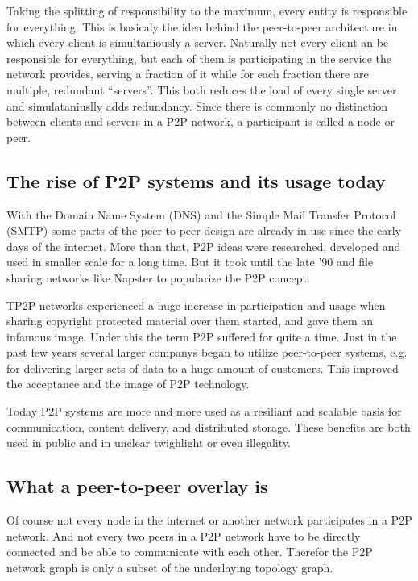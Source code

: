 Taking the splitting of responsibility to the maximum, every entity is responsible for everything. This is basicaly the idea behind the peer-to-peer architecture in which every client is simultaniously a server. Naturally not every client an be responsible for everything, but each of them is participating in the service the network provides, serving a fraction of it while for each fraction there are multiple, redundant ``servers''. This  both reduces the load of every single server and simulataniuslly adds redundancy. Since there is commonly no distinction between clients and servers in a P2P network, a participant is called a node or peer.

\subsection{The rise of P2P systems and its usage today}

With the Domain Name System (DNS) and the Simple Mail Transfer Protocol (SMTP) some parts of the peer-to-peer design are already in use since the early days of the internet. More than that, P2P ideas were researched, developed and used in smaller scale for a long time. But it took until the late '90 and file sharing networks like Napster to popularize the P2P concept.

TP2P networks experienced a huge increase in participation and usage when sharing copyright protected material over them started, and gave them an infamous image. Under this the term P2P suffered for quite a time. Just in the past few years several larger companys began to utilize peer-to-peer systems, e.g. for delivering larger sets of data to a huge amount of customers. This improved the acceptance and the image of P2P technology.

Today P2P systems are more and more used as a resiliant and scalable basis for communication, content delivery, and distributed storage. These benefits are both used in public and in unclear twighlight or even illegality. 

\subsection{What a peer-to-peer overlay is}

Of course not every node in the internet or another network participates in a P2P network. And not every two peers in a P2P network have to be directly connected and be able to communicate with each other. Therefor the P2P network graph is only a subset of the underlaying topology graph.

